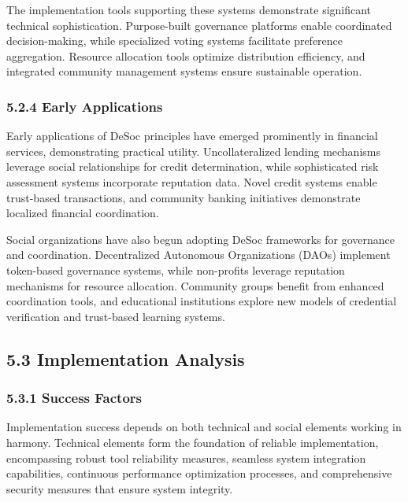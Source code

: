 The implementation tools supporting these systems demonstrate significant technical sophistication. Purpose-built governance platforms enable coordinated decision-making, while specialized voting systems facilitate preference aggregation. Resource allocation tools optimize distribution efficiency, and integrated community management systems ensure sustainable operation.

\hypertarget{early-applications}{%
\subsubsection{5.2.4 Early Applications}\label{early-applications}}

Early applications of DeSoc principles have emerged prominently in financial services, demonstrating practical utility. Uncollateralized lending mechanisms leverage social relationships for credit determination, while sophisticated risk assessment systems incorporate reputation data. Novel credit systems enable trust-based transactions, and community banking initiatives demonstrate localized financial coordination.

Social organizations have also begun adopting DeSoc frameworks for governance and coordination. Decentralized Autonomous Organizations (DAOs) implement token-based governance systems, while non-profits leverage reputation mechanisms for resource allocation. Community groups benefit from enhanced coordination tools, and educational institutions explore new models of credential verification and trust-based learning systems.

\hypertarget{implementation-analysis}{%
\subsection{5.3 Implementation Analysis}\label{implementation-analysis}}

\hypertarget{success-factors-1}{%
\subsubsection{5.3.1 Success Factors}\label{success-factors-1}}

Implementation success depends on both technical and social elements working in harmony. Technical elements form the foundation of reliable implementation, encompassing robust tool reliability measures, seamless system integration capabilities, continuous performance optimization processes, and comprehensive security measures that ensure system integrity.

